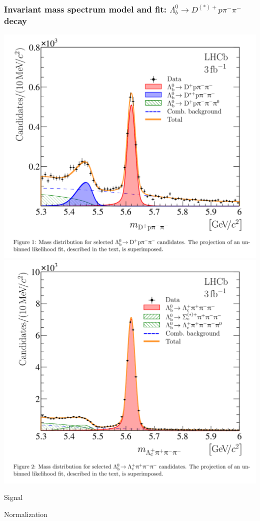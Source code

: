 \documentclass[10pt, aspectratio=169]{beamer}
\def\Lb{{\Lambda_b^0}}
\def\pim{{\pi^-}}
\begin{document}
\begin{frame}[label=model-Lb2Dppipi]%
  \frametitle{Invariant mass spectrum model and fit:
  $\Lb \to D^{(*)+} p \pim\pim$ decay}
  \centering

  \includegraphics[width=.49\linewidth]{figures/conf/Lb2Dppipi-fig001}
  \includegraphics[width=.49\linewidth]{figures/conf/Lb2Dppipi-fig002}
  \parbox{.49\linewidth}{\centering Signal}
  \parbox{.49\linewidth}{\centering Normalization}

\end{frame}%
\end{document}
